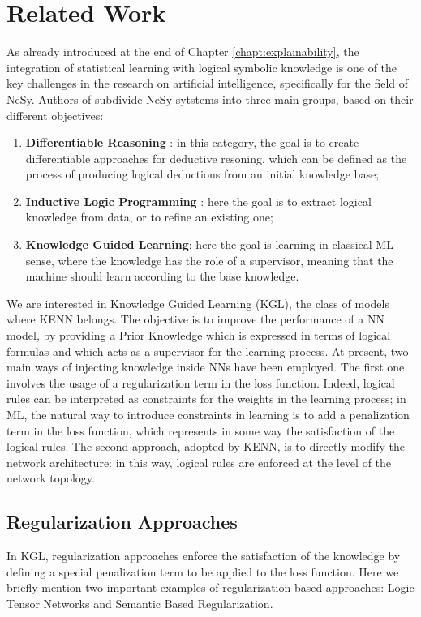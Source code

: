  
 \section{Related Work}
 As already introduced at the end of Chapter \ref{chapt:explainability}, the integration of statistical learning with logical symbolic knowledge is one of the key challenges in the research on artificial intelligence, specifically for the field of NeSy. Authors of \cite{daniele2019kenn} subdivide NeSy sytstems into three main groups, based on their different objectives:
 \begin{enumerate}
 	\item \textbf{Differentiable Reasoning }: in this category, the goal is to create differentiable approaches for deductive resoning, which can be defined as the process of producing logical deductions from an initial knowledge base;
 	\item \textbf{Inductive Logic Programming} : here the goal is to extract logical knowledge from data, or to refine an existing one;
 	\item \textbf{Knowledge Guided Learning}: here the goal is learning in classical ML sense, where the knowledge has the role of a supervisor, meaning that the machine should learn according to the base knowledge.
 \end{enumerate}

 We are interested in Knowledge Guided Learning (KGL), the class of models where KENN belongs. The objective is to improve the performance of a NN model, by providing a Prior Knowledge which is expressed in terms of logical formulas and which acts as a supervisor for the learning process. At present, two main ways of injecting knowledge inside NNs have been employed. The first one involves the usage of a regularization term in the loss function. Indeed, logical rules can be interpreted as constraints for the weights in the learning process; in ML, the natural way to introduce constraints in learning is to add a penalization term in the loss function, which represents in some way the satisfaction of the logical rules. The second approach, adopted by KENN, is to directly modify the network architecture: in this way, logical rules are enforced at the level of the network topology.
 
 \subsection{Regularization Approaches}
In KGL, regularization approaches enforce the satisfaction of the knowledge by defining a special penalization term to be applied to the loss function. Here we briefly mention two important examples of regularization based approaches: Logic Tensor Networks and Semantic Based Regularization.
 
